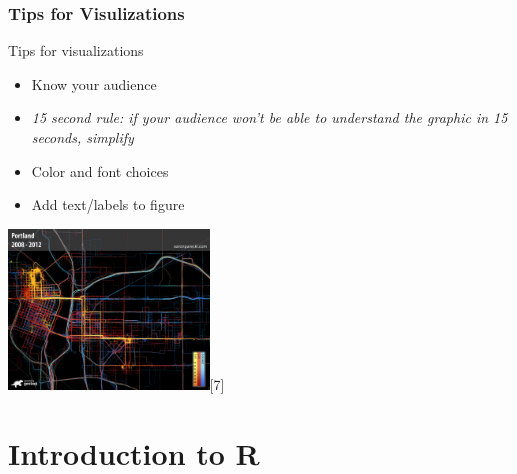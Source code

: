 \section{Tips for Visulizations}
\begin{frame}
	\begin{center}
  		\begin{block}{Tips for visualizations} 
			\begin{itemize}
				\item Know your audience 
				\item \itshape{ 15 second rule:} \normalfont if your audience won't be able to understand the graphic in 15 seconds, simplify
				\item Color and font choices
				\item Add text/labels to figure
			\end{itemize}		
		\end{block}
	\end{center} 

  \begin{center}
  	\includegraphics[width=0.4\textwidth]{images/geolocation_ex}[7]
  \end{center}

\end{frame}

\part{Introduction to R}

